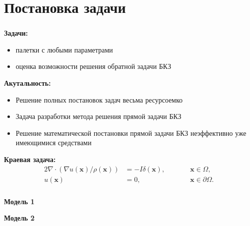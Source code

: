 

\frame[plain]{\titlepage} %


\section{Постановка задачи}

\begin{frame}
\frametitle{\insertsection}

\textbf{Задачи:}
\begin{itemize}    
    \item палетки с любыми параметрами
    \item оценка возможности решения обратной задачи БКЗ
\end{itemize}
\bigskip

\textbf{Акутальность:}
\begin{itemize}
\item Решение полных постановок задач весьма ресурсоемко
\item Задача разработки метода решения прямой задачи БКЗ
\item Решение математической постановки прямой задачи БКЗ неэффективно уже имеющимися средствами
\end{itemize}
\bigskip

\textbf{Краевая задача:}
\begin{alignat*}{2}
\nabla \cdot (\nabla u(\bm x) / \rho(\bm x)) &= -I \delta(\bm x),\qquad && \bm x \in \varOmega, \\
u(\bm x) &= 0, && \bm x \in \partial \varOmega.
\end{alignat*}
\end{frame}

\begin{frame}
\frametitle{\insertsection}

\begin{minipage}[t]{0.47\linewidth}
    \textbf{Модель 1}
\end{minipage}
\hfill
\begin{minipage}[t]{0.47\linewidth}
    \textbf{Модель 2}
\end{minipage}
\end{frame}

